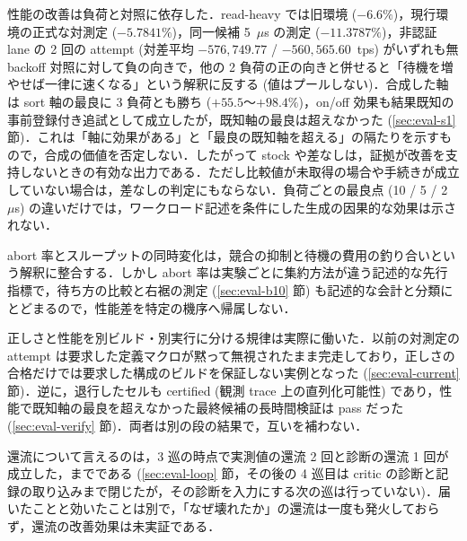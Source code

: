 \documentclass[submit,techrep,noauthor]{ipsj}
\begin{document}
性能の改善は負荷と対照に依存した．read-heavy では旧環境 ($-6.6\%$)，現行環境の正式な対測定 ($-5.7841\%$)，同一候補 5~$\mu$s の測定 ($-11.3787\%$)，非認証 lane の 2 回の attempt (対差平均 $-576{,}749.77$ / $-560{,}565.60$~tps) がいずれも無 backoff 対照に対して負の向きで，他の 2 負荷の正の向きと併せると「待機を増やせば一律に速くなる」という解釈に反する (値はプールしない)．合成した軸は sort 軸の最良に 3 負荷とも勝ち ($+55.5$〜$+98.4\%$)，on/off 効果も結果既知の事前登録付き追試として成立したが，既知軸の最良は超えなかった (\ref{sec:eval-s1} 節)．これは「軸に効果がある」と「最良の既知軸を超える」の隔たりを示すもので，合成の価値を否定しない．したがって stock や差なしは，証拠が改善を支持しないときの有効な出力である．ただし比較値が未取得の場合や手続きが成立していない場合は，差なしの判定にもならない．負荷ごとの最良点 (10 / 5 / 2~$\mu$s) の違いだけでは，ワークロード記述を条件にした生成の因果的な効果は示されない．

abort 率とスループットの同時変化は，競合の抑制と待機の費用の釣り合いという解釈に整合する．しかし abort 率は実験ごとに集約方法が違う記述的な先行指標で，待ち方の比較と右裾の測定 (\ref{sec:eval-b10} 節) も記述的な会計と分類にとどまるので，性能差を特定の機序へ帰属しない．

正しさと性能を別ビルド・別実行に分ける規律は実際に働いた．以前の対測定の attempt は要求した定義マクロが黙って無視されたまま完走しており，正しさの合格だけでは要求した構成のビルドを保証しない実例となった (\ref{sec:eval-current} 節)．逆に，退行したセルも certified (観測 trace 上の直列化可能性) であり，性能で既知軸の最良を超えなかった最終候補の長時間検証は pass だった (\ref{sec:eval-verify} 節)．両者は別の段の結果で，互いを補わない．

還流について言えるのは，3 巡の時点で実測値の還流 2 回と診断の還流 1 回が成立した，までである (\ref{sec:eval-loop} 節，その後の 4 巡目は critic の診断と記録の取り込みまで閉じたが，その診断を入力にする次の巡は行っていない)．届いたことと効いたことは別で，「なぜ壊れたか」の還流は一度も発火しておらず，還流の改善効果は未実証である．
\end{document}
